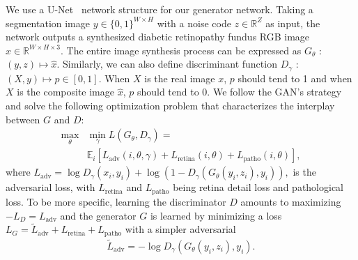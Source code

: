 \documentclass[letterpaper]{article} %
\begin{document}
    We use a U-Net~\cite{ronneberger2015u} network structure for our generator network.%
	Taking a segmentation image $y \in \{ 0,1 \}^{W \times H}$ with a noise code $z \in \mathbb{R}^Z $ as input, the network outputs a synthesized diabetic retinopathy fundus RGB image $\hat{x} \in \mathbb{R}^{W \times H \times 3}$. 	
	The entire image synthesis process can be expressed as $G_{\theta}$ : $ ( y,z ) \mapsto \hat{x}$. Similarly, we can also define discriminant function $D_{\gamma}$ : $ ( X , y) \mapsto p \in [0,1] $. When $X$ is the real image $x$, $p$ should tend to 1 and when $X$ is the composite image $\hat{x}$, $p$ should tend to 0.	
	We follow the GAN's strategy and solve the  following optimization problem that characterizes the interplay between $ G $ and $ D $:
	\begin{align}
	\label{align_allloss} \textstyle
	\max_{\theta} & \textstyle\min_{\gamma} L(G_{\theta}, D_{\gamma}) = \nonumber \\
	&\mathbb{E}_i [L_\mathrm{adv}(i, \theta, \gamma) + L_\mathrm{retina}(i, \theta) 
	  + L_\mathrm{patho} (i, \theta)],
	\end{align}
	where $
	L_\mathrm{adv} = \log D_\gamma(x_i, y_i) + 
	 \log(1 - D_\gamma(G_\theta(y_i,z_i),y_i)),
	$ is the adversarial loss, with $ L_\mathrm{retina} $ and $ L_\mathrm{patho} $ being retina detail loss and pathological loss.
	To be more specific, learning the discriminator $ D $ amounts to maximizing $ -L_D = L_\mathrm{adv} $
	and the generator $ G $ is learned by minimizing a loss $ L_G = \tilde L_\mathrm{adv} + L_\mathrm{retina} + L_\mathrm{patho} $ with a simpler adversarial
	\begin{align}
	\label{align_Gloss} \textstyle
	\tilde L_\mathrm{adv} = -\log D_\gamma (G_\theta(y_i, z_i),y_i) .
	\end{align}
	
	
	
\end{document}
